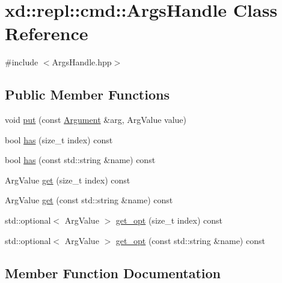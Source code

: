 \hypertarget{classxd_1_1repl_1_1cmd_1_1_args_handle}{}\section{xd\+:\+:repl\+:\+:cmd\+:\+:Args\+Handle Class Reference}
\label{classxd_1_1repl_1_1cmd_1_1_args_handle}


{\ttfamily \#include $<$Args\+Handle.\+hpp$>$}

\subsection*{Public Member Functions}
\begin{DoxyCompactItemize}
\item 
void \mbox{\hyperlink{classxd_1_1repl_1_1cmd_1_1_args_handle_a0a6063b4d4c0d7aa54bcc8c0684ec01f}{put}} (const \mbox{\hyperlink{classxd_1_1repl_1_1cmd_1_1_argument}{Argument}} \&arg, Arg\+Value value)
\item 
bool \mbox{\hyperlink{classxd_1_1repl_1_1cmd_1_1_args_handle_a5aea998ba91aa20c2310b32779b497de}{has}} (size\+\_\+t index) const
\item 
bool \mbox{\hyperlink{classxd_1_1repl_1_1cmd_1_1_args_handle_a4aaee69cad44ada3ca67870f044c6559}{has}} (const std\+::string \&name) const
\item 
Arg\+Value \mbox{\hyperlink{classxd_1_1repl_1_1cmd_1_1_args_handle_aed9dea4b152122487ce37883113cbdeb}{get}} (size\+\_\+t index) const
\item 
Arg\+Value \mbox{\hyperlink{classxd_1_1repl_1_1cmd_1_1_args_handle_aab43823361739d1837f2d5174c4fc15a}{get}} (const std\+::string \&name) const
\item 
std\+::optional$<$ Arg\+Value $>$ \mbox{\hyperlink{classxd_1_1repl_1_1cmd_1_1_args_handle_a030022c0af39ebd479492c565d503bc9}{get\+\_\+opt}} (size\+\_\+t index) const
\item 
std\+::optional$<$ Arg\+Value $>$ \mbox{\hyperlink{classxd_1_1repl_1_1cmd_1_1_args_handle_a9ee75e35abbd6f2c4a372d62b42cd42b}{get\+\_\+opt}} (const std\+::string \&name) const
\end{DoxyCompactItemize}


\subsection{Member Function Documentation}
\mbox{\label{classxd_1_1repl_1_1cmd_1_1_args_handle_aed9dea4b152122487ce37883113cbdeb}} 
